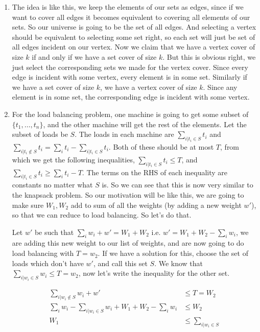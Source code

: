 \documentclass[12pt]{report}
\begin{document}
\begin{enumerate}[label=\textbf{\arabic*.}]
    \item The idea is like this, we keep the elements of our sets as edges, since if we want to cover all edges it becomes equivalent to
    covering all elements of our sets. So our universe is going to be the set of all edges.
    And selecting a vertex should be equivalent to selecting some set right, so each set will just be set of all edges incident on our vertex.
    Now we claim that we have a vertex cover of size $k$ if and only if we have a set cover of size $k$. But this is obvious right, we just 
    select the corresponding sets we made for the vertex cover. Since every edge is incident with some vertex, every element is in some set.
    Similarly if we have a set cover of size $k$, we have a vertex cover of size $k$. Since any element is in some set, the corresponding edge 
    is incident with some vertex.

    \item For the load balancing problem, one machine is going to get some subset of $\{t_1, \dots, t_n\}$, and the other machine will get
    the rest of the elements. Let the subset of loads be $S$. The loads in each machine are $\sum_{i|t_i \in S} t_i$ and 
    $\sum_{i|t_i \notin S} t_i = \sum_i t_i - \sum_{i|t_i \in S} t_i$. Both of these should be at most $T$, from which we get the following 
    inequalities, $\sum_{i|t_i \in S} t_i \leq T$, and $\sum_{i|t_i \in S} t_i \geq \sum_i t_i - T$. The terms on the RHS of each inequality are 
    constants no matter what $S$ is. So we can see that this is now very similar to the knapsack problem. So our motivation will be like this,
    we are going to make sure $W_1, W_2$ add to sum of all the weights (by adding a new weight $w'$), 
    so that we can reduce to load balancing. So let's do that.

    Let $w'$ be such that $\sum_i w_i + w' = W_1 + W_2$ i.e. $w' = W_1 + W_2 - \sum_i w_i$, we are adding this new weight to our list of weights,
    and are now going to do load balancing with $T = w_2$. If we have a solution for this, choose the set of loads which don't have $w'$, and 
    call this set $S$. We know that $\sum_{i|w_i \in S} w_i \leq T = w_2$, now let's write the inequality for the other set.

    \begin{align*}
        \sum_{i|w_i \notin S} w_i + w' &\leq T = W_2 \\
        \sum_i w_i - \sum_{i|w_i \in S} w_i + W_1 + W_2 - \sum_i w_i &\leq W_2 \\
        W_1 &\leq \sum_{i|w_i \in S} 
    \end{align*}


\end{enumerate}
\end{document}
